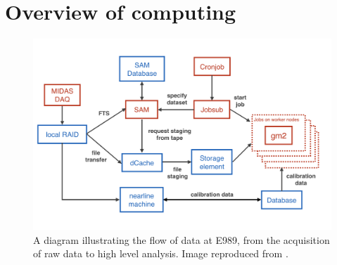 \section{Overview of computing}\label{sec:Computing}

\begin{figure}[t!]
\centering{}
\includegraphics[trim={0 0 0 0},clip,width=.85\textwidth]{Images/Chapter3/DataRecoFlowDiagram.png}
\caption{A diagram illustrating the flow of data at E989, from the acquisition of raw data to high level analysis. Image reproduced from \cite{DataReco}.}
\label{fig:DataRecoFlow}
\end{figure}

